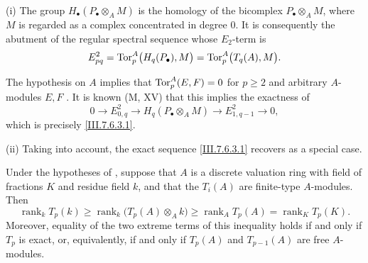\begin{remarks}[7.6.4]
\label{III.7.6.4}
\textnormal{(i)}
The group $H_\bullet(P_\bullet\otimes_A M)$ is the homology of
the bicomplex $P_\bullet\otimes_A M$, where $M$ is regarded as
a complex concentrated in degree $0$.  It is consequently
 the abutment of the regular
spectral sequence whose $E_2$-term is
\[
  E^2_{pq}
  =
  \operatorname{Tor}_p^A\bigl(H_q(P_\bullet),M\bigr)
  =
  \operatorname{Tor}_p^A\bigl(T_q(A),M\bigr).
\]

The hypothesis on $A$ implies that
$\operatorname{Tor}_p^A(E,F)=0$ for $p\geq 2$ and arbitrary $A$-modules
$E,F$ .  It is known (M, XV) that this
implies the exactness of
\[
  0\longrightarrow E^2_{0,q}
  \longrightarrow H_q(P_\bullet\otimes_A M)
  \longrightarrow E^2_{1,q-1}
  \longrightarrow 0,
\]
which is precisely \eqref{III.7.6.3.1}.

\medskip
\textnormal{(ii)}
Taking  into account, the exact sequence
\eqref{III.7.6.3.1} recovers  as a special
case.
\end{remarks}

\begin{corollary}[7.6.5]
\label{III.7.6.5}
Under the hypotheses of , suppose that $A$ is
a discrete valuation ring with field of fractions $K$ and
residue field $k$, and that the $T_i(A)$ are finite-type
$A$-modules.  Then
\[
  \operatorname{rank}_k T_p(k)
  \geq
  \operatorname{rank}_k\bigl(T_p(A)\otimes_A k\bigr)
  \geq
  \operatorname{rank}_A T_p(A)
  =
  \operatorname{rank}_K T_p(K).
  \tag{7.6.5.1}\label{III.7.6.5.1}
\]
Moreover, equality of the two extreme terms of this
inequality holds if and only if $T_p$ is exact, or,
equivalently, if and only if $T_p(A)$ and $T_{p-1}(A)$ are
free $A$-modules.
\end{corollary}

